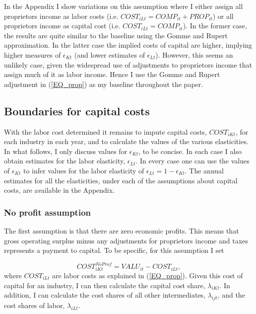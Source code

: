 \documentclass[11pt]{article}
\begin{document}
In the Appendix I show variations on this assumption where I either assign all proprietors income as labor costs (i.e. $COST_{iLt} = COMP_{it} + PROP_{it}$) or all proprietors income as capital cost (i.e. $COST_{iLt} = COMP_{it}$). In the former case, the results are quite similar to the baseline using the Gomme and Rupert approximation. In the latter case the implied costs of capital are higher, implying higher measures of $\epsilon_{Kt}$ (and lower estimates of $\epsilon_{Lt}$). However, this seems an unlikely case, given the widespread use of adjustments to proprietors income that assign much of it as labor income. Hence I use the Gomme and Rupert adjustment in (\ref{EQ_prop}) as my baseline throughout the paper.

\subsection{Boundaries for capital costs}
With the labor cost determined it remains to impute capital costs, $COST_{iKt}$, for each industry in each year, and to calculate the values of the various elasticities. In what follows, I only discuss values for $\epsilon_{Kt}$, to be concise. In each case I also obtain estimates for the labor elasticity, $\epsilon_{Lt}$. In every case one can use the values of $\epsilon_{Kt}$ to infer values for the labor elasticity of $\epsilon_{Lt} = 1 - \epsilon_{Kt}$. The annual estimates for all the elasticities, under each of the assumptions about capital costs, are available in the Appendix.

\subsubsection{No profit assumption}
The first assumption is that there are zero economic profits. This means that gross operating surplus minus any adjustments for proprietors income and taxes represents a payment to capital. To be specific, for this assumption I set

\begin{equation}
	COST^{NoProf}_{iKt} = VALU_{it} - COST_{iLt},  \label{EQ_noprofit}
\end{equation}
where $COST_{iLt}$ are labor costs as explained in (\ref{EQ_prop}). Given this cost of capital for an industry, I can then calculate the capital cost share, $\lambda_{iKt}$. In addition, I can calculate the cost shares of all other intermediates, $\lambda_{ijt}$, and the cost shares of labor, $\lambda_{iLt}$.
\end{document}

